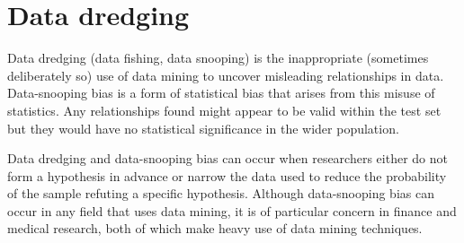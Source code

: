 \section{Data dredging}

Data dredging (data fishing, data snooping) is the inappropriate (sometimes deliberately so) use of data mining to uncover misleading relationships in data. Data-snooping bias is a form of statistical bias that arises from this misuse of statistics. Any relationships found might appear to be valid within the test set but they would have no statistical significance in the wider population.

Data dredging and data-snooping bias can occur when researchers either do not form a hypothesis in advance or narrow the data used to reduce the probability of the sample refuting a specific hypothesis. Although data-snooping bias can occur in any field that uses data mining, it is of particular concern in finance and medical research, both of which make heavy use of data mining techniques.